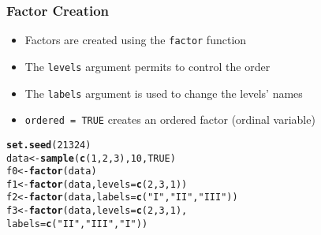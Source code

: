 \documentclass[paper=screen,mathserif]{beamer}\usepackage[]{graphicx}\usepackage[]{color}
\makeatletter
\newcommand{\hlnum}[1]{\textcolor[rgb]{0.686,0.059,0.569}{#1}}%
\newcommand{\hlstr}[1]{\textcolor[rgb]{0.192,0.494,0.8}{#1}}%
\newcommand{\hlstd}[1]{\textcolor[rgb]{0.345,0.345,0.345}{#1}}%
\newcommand{\hlkwb}[1]{\textcolor[rgb]{0.69,0.353,0.396}{#1}}%
\newcommand{\hlkwc}[1]{\textcolor[rgb]{0.333,0.667,0.333}{#1}}%
\newcommand{\hlkwd}[1]{\textcolor[rgb]{0.737,0.353,0.396}{\textbf{#1}}}%
\newenvironment{kframe}{%
 \def\at@end@of@kframe{}%
 \ifinner\ifhmode%
  \def\at@end@of@kframe{\end{minipage}}%
  \begin{minipage}{\columnwidth}%
 \fi\fi%
 \def\FrameCommand##1{\hskip\@totalleftmargin \hskip-\fboxsep
 \colorbox{shadecolor}{##1}\hskip-\fboxsep
     \hskip-\linewidth \hskip-\@totalleftmargin \hskip\columnwidth}%
 \MakeFramed {\advance\hsize-\width
   \@totalleftmargin\z@ \linewidth\hsize
   \@setminipage}}%
 {\par\unskip\endMakeFramed%
 \at@end@of@kframe}
\newenvironment{knitrout}{}{} %
\newcommand{\ft}[1]{\frametitle{#1}}
\makeatother
\begin{document}
\begin{frame}[fragile]
  \ft{Factor Creation}
  \begin{itemize}
  \item Factors are created using the {\tt factor} function
  \item The {\tt levels} argument permits to control the order
  \item The {\tt labels} argument is used to change the levels' names
  \item \verb|ordered = TRUE| creates an ordered factor (ordinal
    variable)
  \end{itemize}
\begin{knitrout}\scriptsize
{}\color{fgcolor}\begin{kframe}
\begin{alltt}
\hlkwd{set.seed}\hlstd{(}\hlnum{21324}\hlstd{)}
\hlstd{data} \hlkwb{<-} \hlkwd{sample}\hlstd{(}\hlkwd{c}\hlstd{(}\hlnum{1}\hlstd{,} \hlnum{2}\hlstd{,} \hlnum{3}\hlstd{),} \hlnum{10}\hlstd{,} \hlnum{TRUE}\hlstd{)}
\hlstd{f0} \hlkwb{<-} \hlkwd{factor}\hlstd{(data)}
\hlstd{f1} \hlkwb{<-} \hlkwd{factor}\hlstd{(data,} \hlkwc{levels} \hlstd{=} \hlkwd{c}\hlstd{(}\hlnum{2}\hlstd{,} \hlnum{3}\hlstd{,} \hlnum{1}\hlstd{))}
\hlstd{f2} \hlkwb{<-} \hlkwd{factor}\hlstd{(data,} \hlkwc{labels} \hlstd{=} \hlkwd{c}\hlstd{(}\hlstr{"I"}\hlstd{,} \hlstr{"II"}\hlstd{,} \hlstr{"III"}\hlstd{))}
\hlstd{f3} \hlkwb{<-} \hlkwd{factor}\hlstd{(data,} \hlkwc{levels} \hlstd{=} \hlkwd{c}\hlstd{(}\hlnum{2}\hlstd{,} \hlnum{3}\hlstd{,} \hlnum{1}\hlstd{),}
             \hlkwc{labels} \hlstd{=} \hlkwd{c}\hlstd{(}\hlstr{"II"}\hlstd{,} \hlstr{"III"}\hlstd{,} \hlstr{"I"}\hlstd{))}
\end{alltt}
\end{kframe}
\end{knitrout}
\end{frame}
\end{document}
